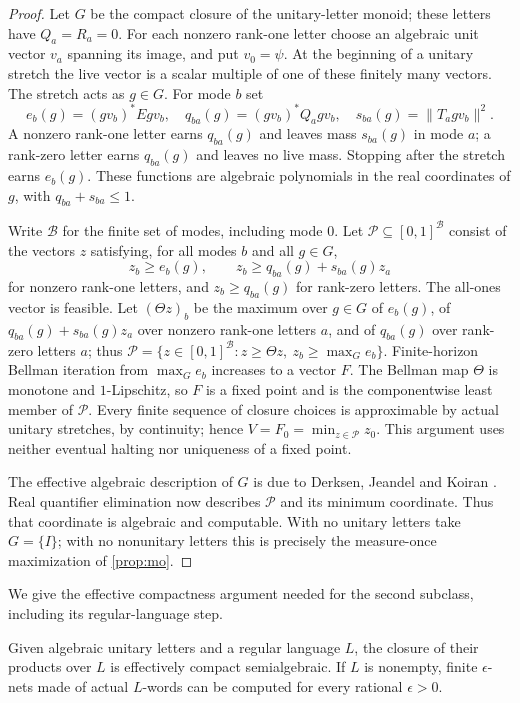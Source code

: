 \documentclass[11pt]{article}
\theoremstyle{plain}
\theoremstyle{definition}
\theoremstyle{remark}
\begin{document}
\begin{proof}
Let $G$ be the compact closure of the unitary-letter monoid; these letters have $Q_a=R_a=0$. For each nonzero rank-one letter choose an algebraic unit vector $v_a$ spanning its image, and put $v_0=\psi$. At the beginning of a unitary stretch the live vector is a scalar multiple of one of these finitely many vectors. The stretch acts as $g\in G$. For mode $b$ set
\[
 e_b(g)=(gv_b)^*Egv_b,\quad
 q_{ba}(g)=(gv_b)^*Q_agv_b,\quad
 s_{ba}(g)=\|T_agv_b\|^2.
\]
A nonzero rank-one letter earns $q_{ba}(g)$ and leaves mass $s_{ba}(g)$ in mode $a$; a rank-zero letter earns $q_{ba}(g)$ and leaves no live mass. Stopping after the stretch earns $e_b(g)$. These functions are algebraic polynomials in the real coordinates of $g$, with $q_{ba}+s_{ba}\le1$.

Write $\mathcal B$ for the finite set of modes, including mode $0$. Let $\mathcal P\subseteq[0,1]^{\mathcal B}$ consist of the vectors $z$ satisfying, for all modes $b$ and all $g\in G$,
\[
 z_b\ge e_b(g),\qquad
 z_b\ge q_{ba}(g)+s_{ba}(g)z_a
\]
for nonzero rank-one letters, and $z_b\ge q_{ba}(g)$ for rank-zero letters. The all-ones vector is feasible. Let $(\Theta z)_b$ be the maximum over $g\in G$ of $e_b(g)$, of $q_{ba}(g)+s_{ba}(g)z_a$ over nonzero rank-one letters $a$, and of $q_{ba}(g)$ over rank-zero letters $a$; thus $\mathcal P=\{z\in[0,1]^{\mathcal B}:z\ge\Theta z,\ z_b\ge\max_Ge_b\}$. Finite-horizon Bellman iteration from $\max_G e_b$ increases to a vector $F$. The Bellman map $\Theta$ is monotone and $1$-Lipschitz, so $F$ is a fixed point and is the componentwise least member of $\mathcal P$. Every finite sequence of closure choices is approximable by actual unitary stretches, by continuity; hence $V=F_0=\min_{z\in\mathcal P}z_0$. This argument uses neither eventual halting nor uniqueness of a fixed point.

The effective algebraic description of $G$ is due to Derksen, Jeandel and Koiran \cite{DJK05}. Real quantifier elimination now describes $\mathcal P$ and its minimum coordinate. Thus that coordinate is algebraic and computable. With no unitary letters take $G=\{I\}$; with no nonunitary letters this is precisely the measure-once maximization of \cref{prop:mo}.
\end{proof}

We give the effective compactness argument needed for the second subclass, including its regular-language step.

\begin{lemma}\label{lem:regular-unitary}
Given algebraic unitary letters and a regular language $L$, the closure of their products over $L$ is effectively compact semialgebraic. If $L$ is nonempty, finite $\epsilon$-nets made of actual $L$-words can be computed for every rational $\epsilon>0$.
\end{lemma}
\end{document}
